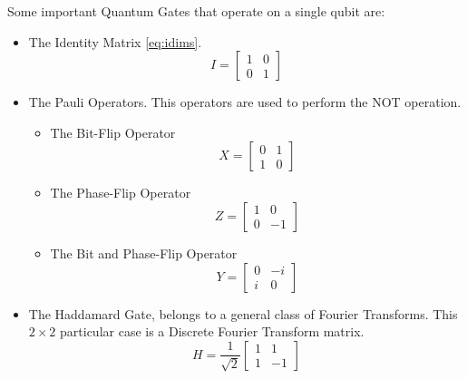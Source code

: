 Some important Quantum Gates that operate on a single qubit are:

\begin{itemize}
\item The Identity Matrix \ref{eq:idims}.
\begin{equation}
\label{eq:idims}
I=\left[\begin{array}{cc}
1 & 0\\
0 & 1
\end{array}\right]
\end{equation}

\item The Pauli Operators. This operators are used to perform the NOT operation. 
	\begin{itemize}
		\item The Bit-Flip Operator\begin{equation}
\label{eq:idims_1}
X=\left[\begin{array}{cc}
0 & 1\\
1 & 0
\end{array}\right]
\end{equation}
		\item The Phase-Flip Operator\begin{equation}
\label{eq:idims_2}
Z=\left[\begin{array}{cc}
1 & 0\\
0 & -1
\end{array}\right]
\end{equation}
\item The Bit and Phase-Flip Operator\begin{equation}
\label{eq:idims_3}
Y=\left[\begin{array}{cc}
0 & -i\\
i & 0
\end{array}\right]
\end{equation}
	\end{itemize}
\item The Haddamard Gate, belongs to a general class of Fourier Transforms. This $2\times 2$ particular case is a Discrete Fourier Transform matrix.
\begin{equation}
\label{eq:idimssd_3}
H=\frac{1}{\sqrt{2}}\left[\begin{array}{cc}
1 & 1\\
1 & -1
\end{array}\right]
\end{equation}
\end{itemize}


